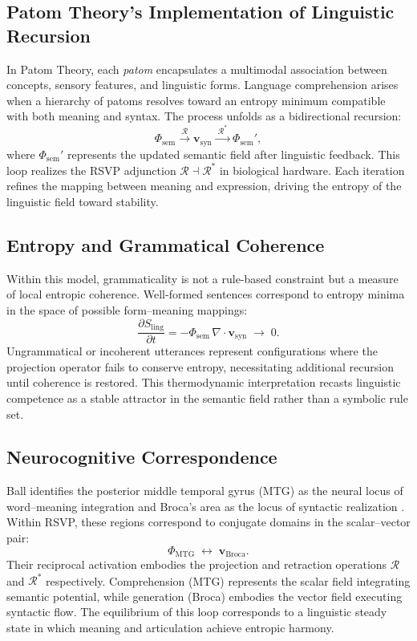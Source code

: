 \documentclass[11pt]{article}
\begin{document}
\subsection{Patom Theory’s Implementation of Linguistic Recursion}
In Patom Theory, each \textit{patom} encapsulates a multimodal association between concepts, sensory features, and linguistic forms. Language comprehension arises when a hierarchy of patoms resolves toward an entropy minimum compatible with both meaning and syntax. The process unfolds as a bidirectional recursion:
\[
\Phi_{\mathrm{sem}} \xrightarrow{\;\mathcal{R}\;} \mathbf{v}_{\mathrm{syn}}
\xrightarrow{\;\mathcal{R}^{\ast}\;} \Phi_{\mathrm{sem}}',
\]
where $\Phi_{\mathrm{sem}}'$ represents the updated semantic field after linguistic feedback. This loop realizes the RSVP adjunction $\mathcal{R} \dashv \mathcal{R}^{\ast}$ in biological hardware. Each iteration refines the mapping between meaning and expression, driving the entropy of the linguistic field toward stability.

\subsection{Entropy and Grammatical Coherence}
Within this model, grammaticality is not a rule-based constraint but a measure of local entropic coherence. Well-formed sentences correspond to entropy minima in the space of possible form--meaning mappings:
\[
\frac{\partial S_{\mathrm{ling}}}{\partial t}
= -\Phi_{\mathrm{sem}}\, \nabla\!\cdot\!\mathbf{v}_{\mathrm{syn}} \;\to\; 0.
\]
Ungrammatical or incoherent utterances represent configurations where the projection operator fails to conserve entropy, necessitating additional recursion until coherence is restored. This thermodynamic interpretation recasts linguistic competence as a stable attractor in the semantic field rather than a symbolic rule set.

\subsection{Neurocognitive Correspondence}
Ball identifies the posterior middle temporal gyrus (MTG) as the neural locus of word--meaning integration and Broca’s area as the locus of syntactic realization \citep{ball2020patom}. Within RSVP, these regions correspond to conjugate domains in the scalar--vector pair:
\[
\Phi_{\mathrm{MTG}} \;\leftrightarrow\; \mathbf{v}_{\mathrm{Broca}}.
\]
Their reciprocal activation embodies the projection and retraction operations $\mathcal{R}$ and $\mathcal{R}^{\ast}$ respectively. Comprehension (MTG) represents the scalar field integrating semantic potential, while generation (Broca) embodies the vector field executing syntactic flow. The equilibrium of this loop corresponds to a linguistic steady state in which meaning and articulation achieve entropic harmony.
\end{document}

